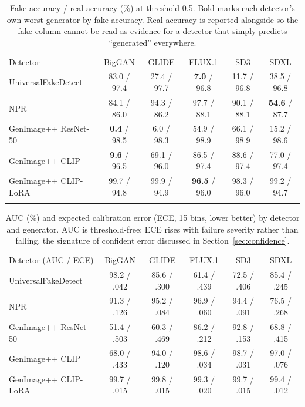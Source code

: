 \documentclass[3p,times,procedia]{elsarticle}
\begin{document}
\begin{table}[h]
\caption{Fake-accuracy / real-accuracy (\%) at threshold 0.5. Bold marks
each detector's own worst generator by fake-accuracy. Real-accuracy is
reported alongside so the fake column cannot be read as evidence for a
detector that simply predicts ``generated'' everywhere.}
\label{tab:results}
\begin{tabular*}{\hsize}{@{\extracolsep{\fill}}lccccc@{}}
\toprule
Detector & BigGAN & GLIDE & FLUX.1 & SD3 & SDXL \\
\colrule
UniversalFakeDetect & 83.0 / 97.4 & 27.4 / 97.7 & \textbf{7.0} / 96.8 & 11.7 / 96.8 & 38.5 / 96.8 \\
NPR & 84.1 / 86.0 & 94.3 / 86.2 & 97.7 / 88.1 & 90.1 / 88.1 & \textbf{54.6} / 87.7 \\
GenImage++ ResNet-50 & \textbf{0.4} / 98.5 & 6.0 / 98.3 & 54.9 / 98.9 & 66.1 / 98.9 & 15.2 / 98.6 \\
GenImage++ CLIP & \textbf{9.6} / 96.5 & 69.1 / 96.0 & 86.5 / 97.4 & 88.6 / 97.4 & 77.0 / 97.4 \\
GenImage++ CLIP-LoRA & 99.7 / 94.8 & 99.9 / 94.9 & \textbf{96.5} / 96.0 & 98.3 / 96.0 & 99.2 / 94.7 \\
\botrule
\end{tabular*}
\end{table}

\begin{table}[h]
\caption{AUC (\%) and expected calibration error (ECE, 15 bins, lower
better) by detector and generator. AUC is threshold-free; ECE rises with
failure severity rather than falling, the signature of confident error
discussed in Section~\ref{sec:confidence}.}
\label{tab:auc}
\begin{tabular*}{\hsize}{@{\extracolsep{\fill}}lccccc@{}}
\toprule
Detector (AUC / ECE) & BigGAN & GLIDE & FLUX.1 & SD3 & SDXL \\
\colrule
UniversalFakeDetect & 98.2 / .042 & 85.6 / .300 & 61.4 / .439 & 72.5 / .406 & 85.4 / .245 \\
NPR & 91.3 / .126 & 95.2 / .084 & 96.9 / .060 & 94.4 / .091 & 76.5 / .268 \\
GenImage++ ResNet-50 & 51.4 / .503 & 60.3 / .469 & 86.2 / .212 & 92.8 / .153 & 68.8 / .415 \\
GenImage++ CLIP & 68.0 / .433 & 94.0 / .120 & 98.6 / .034 & 98.7 / .031 & 97.0 / .076 \\
GenImage++ CLIP-LoRA & 99.7 / .015 & 99.8 / .015 & 99.3 / .020 & 99.7 / .015 & 99.4 / .012 \\
\botrule
\end{tabular*}
\end{table}
\end{document}
